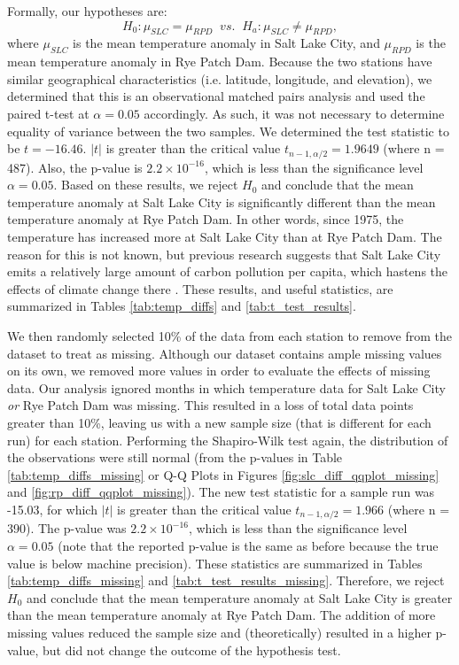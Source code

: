 Formally, our hypotheses are: $$H_{0}: \mu_{SLC} = \mu_{RPD} \;\; vs. \;\; H_{a}: \mu_{SLC} \neq \mu_{RPD},$$ where $\mu_{SLC}$ is the mean temperature anomaly in Salt Lake City, and $\mu_{RPD}$ is the mean temperature anomaly in Rye Patch Dam. Because the two stations have similar geographical characteristics (i.e. latitude, longitude, and elevation), we determined that this is an observational matched pairs analysis and used the paired t-test at $\alpha = 0.05$ accordingly. As such, it was not necessary to determine equality of variance between the two samples. We determined the test statistic to be $t = -16.46$. $|t|$ is greater than the critical value $t_{n-1,\alpha/2} = 1.9649$ (where n = 487). Also, the p-value is $2.2 \times 10^{-16}$, which is less than the significance level $\alpha = 0.05$. Based on these results, we reject $H_{0}$ and conclude that the mean temperature anomaly at Salt Lake City is significantly different than the mean temperature anomaly at Rye Patch Dam. In other words, since 1975, the temperature has increased more at Salt Lake City than at Rye Patch Dam. The reason for this is not known, but previous research suggests that Salt Lake City emits a relatively large amount of carbon pollution per capita, which hastens the effects of climate change there \cite{obama_report}. These results, and useful statistics, are summarized in Tables \ref{tab:temp_diffs} and \ref{tab:t_test_results}.

We then randomly selected 10\% of the data from each station to remove from the dataset to treat as missing. Although our dataset contains ample missing values on its own, we removed more values in order to evaluate the effects of missing data. Our analysis ignored months in which temperature data for Salt Lake City \textit{or} Rye Patch Dam was missing. This resulted in a loss of total data points greater than 10\%, leaving us with a new sample size (that is different for each run) for each station. Performing the Shapiro-Wilk test again, the distribution of the observations were still normal (from the p-values in Table \ref{tab:temp_diffs_missing} or Q-Q Plots in Figures \ref{fig:slc_diff_qqplot_missing} and \ref{fig:rp_diff_qqplot_missing}). The new test statistic for a sample run was -15.03, for which $|t|$ is greater than the critical value $t_{n-1,\alpha/2} = 1.966$ (where n = 390). The p-value was $2.2 \times 10^{-16}$, which is less than the significance level $\alpha = 0.05$ (note that the reported p-value is the same as before because the true value is below machine precision). These statistics are summarized in Tables \ref{tab:temp_diffs_missing} and \ref{tab:t_test_results_missing}. Therefore, we reject $H_{0}$ and conclude that the mean temperature anomaly at Salt Lake City is greater than the mean temperature anomaly at Rye Patch Dam. The addition of more missing values reduced the sample size and (theoretically) resulted in a higher p-value, but did not change the outcome of the hypothesis test.